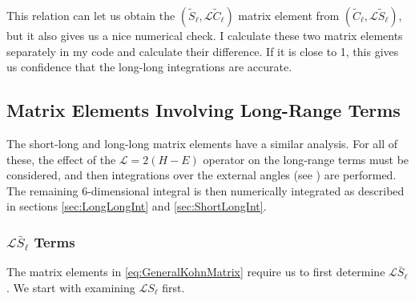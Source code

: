 \documentclass[Dissertation.tex]{subfiles}
\begin{document}
This relation can let us obtain the $(\widetilde{S}_\ell,\mathcal{L}\widetilde{C}_\ell)$ matrix element from $(\widetilde{C}_\ell,\mathcal{L}\widetilde{S}_\ell)$, but it also gives us a nice numerical check. I calculate these two matrix elements separately in my code and calculate their difference. If it is close to 1, this gives us confidence that the long-long integrations are accurate.


\subsection{Matrix Elements Involving Long-Range Terms}
\label{sec:MatrixLong}
The short-long and long-long matrix elements have a similar analysis. For all of these, the effect of the $\mathcal{L} = 2(H-E)$ operator on the long-range terms must be considered, and then integrations over the external angles (see ) are performed. The remaining 6-dimensional integral is then numerically integrated as described in sections \ref{sec:LongLongInt} and \ref{sec:ShortLongInt}.

\subsubsection{\texorpdfstring{$\mathcal{L}\bar{S}_\ell$}{LS} Terms}
\label{sec:LSTerms}
The matrix elements in \cref{eq:GeneralKohnMatrix} require us to first determine $\mathcal{L}\bar{S}_\ell$. We start with examining $\mathcal{L}S_\ell$ first.
\end{document}
